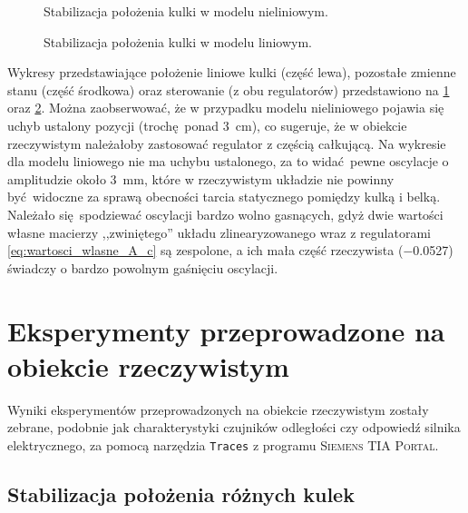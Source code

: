 \begin{figure}[h]
    
    \caption{Stabilizacja położenia kulki w modelu nieliniowym.}
    \label{fig:stabilizacja_modelu_nieliniowego}
\end{figure}

\begin{figure}[h]
    
    \caption{Stabilizacja położenia kulki w modelu liniowym.}
    \label{fig:stabilizacja_modelu_liniowego}
\end{figure}

Wykresy przedstawiające położenie liniowe kulki (część lewa), pozostałe zmienne stanu (część środkowa) oraz sterowanie (z obu regulatorów) przedstawiono na \cref{fig:stabilizacja_modelu_nieliniowego} oraz \cref{fig:stabilizacja_modelu_liniowego}. Można zaobserwować, że w przypadku modelu nieliniowego pojawia się uchyb ustalony pozycji (trochę ponad \SI{3}{\centi\meter}), co sugeruje, że w obiekcie rzeczywistym należałoby zastosować regulator z częścią całkującą. Na wykresie dla modelu liniowego nie ma uchybu ustalonego, za to widać pewne oscylacje o amplitudzie około \SI{3}{\milli\metre}, które w rzeczywistym układzie nie powinny być widoczne za sprawą obecności tarcia statycznego pomiędzy kulką i belką. Należało się spodziewać oscylacji bardzo wolno gasnących, gdyż dwie wartości własne macierzy ,,zwiniętego'' układu zlinearyzowanego wraz z regulatorami \eqref{eq:wartosci_wlasne_A_c} są zespolone, a ich mała część rzeczywista (\num{-0.0527}) świadczy o bardzo powolnym gaśnięciu oscylacji.

\section{Eksperymenty przeprowadzone na obiekcie rzeczywistym}
\label{sec:ch9_eksperymenty}

Wyniki eksperymentów przeprowadzonych na obiekcie rzeczywistym zostały zebrane, podobnie jak charakterystyki czujników odległości czy odpowiedź silnika elektrycznego, za pomocą narzędzia \texttt{Traces} z programu \textsc{Siemens TIA Portal}.

\subsection{Stabilizacja położenia różnych kulek}
\label{subsec:ch9_stabilizacja_polozenia_roznych_kulek}

